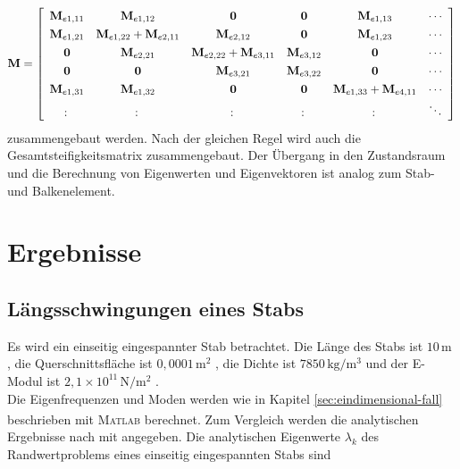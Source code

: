 \documentclass[a4paper,10pt,twoside]{article}
\numberwithin{equation}{section} %
\numberwithin{figure}{section}   %
\numberwithin{table}{section}    %
\newcommand{\Matlab}{\textsc{Matlab}\textsuperscript{\textregistered} }
\begin{document}
    \begin{equation}\label{equ:platten-M}
    \renewcommand\arraystretch{1.3}
    \mathbf{M} = 
    \left[ 
    \begin{array}{c c c c c c}
    \mathbf{M}_{e1,11} & \mathbf{M}_{e1,12}                     & \mathbf{0}                             & \mathbf{0}          & \mathbf{M}_{e1,13}                     & \cdots \\
    \mathbf{M}_{e1,21} & \mathbf{M}_{e1,22} +\mathbf{M}_{e2,11} & \mathbf{M}_{e2,12}                     & \mathbf{0}          & \mathbf{M}_{e1,23}                     & \cdots \\
    \mathbf{0}         & \mathbf{M}_{e2,21}                     & \mathbf{M}_{e2,22} +\mathbf{M}_{e3,11} & \mathbf{M}_{e3,12}  & \mathbf{0}                             & \cdots \\
    \mathbf{0}         & \mathbf{0}                             & \mathbf{M}_{e3,21}                     & \mathbf{M}_{e3,22}  & \mathbf{0}                             & \cdots \\
    \mathbf{M}_{e1,31} & \mathbf{M}_{e1,32}                     & \mathbf{0}                             & \mathbf{0}          & \mathbf{M}_{e1,33} +\mathbf{M}_{e4,11} & \cdots \\
    \colon             & \colon                                 & \colon                                 & \colon              & \colon                                 & \ddots 
    \end{array}
    \right] 
    \end{equation}
    zusammengebaut werden. Nach der gleichen Regel wird auch die Gesamtsteifigkeitsmatrix zusammengebaut. Der Übergang in den Zustandsraum und die Berechnung von Eigenwerten und Eigenvektoren ist analog zum Stab- und Balkenelement.
		
	\clearpage
	\pagestyle{fancy}
	\section{Ergebnisse} \label{sec:ergebnisse}
	
	\subsection{Längsschwingungen eines Stabs} \label{sec:analysieren-stab}
	Es wird ein einseitig eingespannter Stab betrachtet. Die Länge des Stabs ist $ 10 \, \text{m} $ , die Querschnittsfläche ist $ 0,0001 \,  \text{m}^{2} $ , die Dichte ist $ 7850 \,  \text{kg}/ \text{m}^{3} $ und der E-Modul ist $ 2,1\times10^{11} \,  \text{N}/ \text{m}^{2} $ .\\
	Die Eigenfrequenzen und Moden werden wie in Kapitel \ref{sec:eindimensional-fall} beschrieben mit \Matlab berechnet. Zum Vergleich werden die analytischen Ergebnisse nach \cite{stephan1995schwingungen} mit angegeben. Die analytischen Eigenwerte $ \lambda_{k} $ des Randwertproblems eines einseitig eingespannten Stabs sind
	
\end{document}
